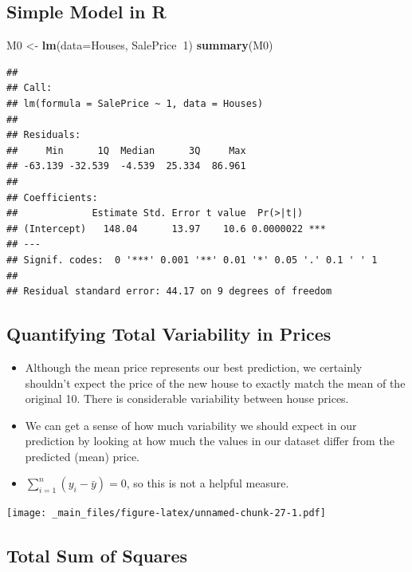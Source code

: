 \documentclass[]{book}
\newenvironment{Shaded}{\begin{snugshade}}{\end{snugshade}}
\newcommand{\KeywordTok}[1]{\textcolor[rgb]{0.13,0.29,0.53}{\textbf{#1}}}
\newcommand{\DataTypeTok}[1]{\textcolor[rgb]{0.13,0.29,0.53}{#1}}
\newcommand{\DecValTok}[1]{\textcolor[rgb]{0.00,0.00,0.81}{#1}}
\newcommand{\StringTok}[1]{\textcolor[rgb]{0.31,0.60,0.02}{#1}}
\newcommand{\OperatorTok}[1]{\textcolor[rgb]{0.81,0.36,0.00}{\textbf{#1}}}
\newcommand{\NormalTok}[1]{#1}
\begin{document}
\subsection{Simple Model in R}\label{simple-model-in-r}

\begin{Shaded}
\begin{Highlighting}[]
\NormalTok{M0 <-}\StringTok{ }\KeywordTok{lm}\NormalTok{(}\DataTypeTok{data=}\NormalTok{Houses, SalePrice}\OperatorTok{~}\DecValTok{1}\NormalTok{)}
\KeywordTok{summary}\NormalTok{(M0)}
\end{Highlighting}
\end{Shaded}

\begin{verbatim}
## 
## Call:
## lm(formula = SalePrice ~ 1, data = Houses)
## 
## Residuals:
##     Min      1Q  Median      3Q     Max 
## -63.139 -32.539  -4.539  25.334  86.961 
## 
## Coefficients:
##             Estimate Std. Error t value  Pr(>|t|)    
## (Intercept)   148.04      13.97    10.6 0.0000022 ***
## ---
## Signif. codes:  0 '***' 0.001 '**' 0.01 '*' 0.05 '.' 0.1 ' ' 1
## 
## Residual standard error: 44.17 on 9 degrees of freedom
\end{verbatim}

\subsection{Quantifying Total Variability in
Prices}\label{quantifying-total-variability-in-prices}

\begin{itemize}
\item
  Although the mean price represents our best prediction, we certainly
  shouldn't expect the price of the new house to exactly match the mean
  of the original 10. There is considerable variability between house
  prices.
\item
  We can get a sense of how much variability we should expect in our
  prediction by looking at how much the values in our dataset differ
  from the predicted (mean) price.
\item
  \(\displaystyle\sum_{i=1}^n (y_i - \bar{y})=0\), so this is not a
  helpful measure.
\end{itemize}

\texttt{[image: \_main\_files/figure-latex/unnamed-chunk-27-1.pdf]}

\subsection{Total Sum of Squares}\label{total-sum-of-squares}
\end{document}
